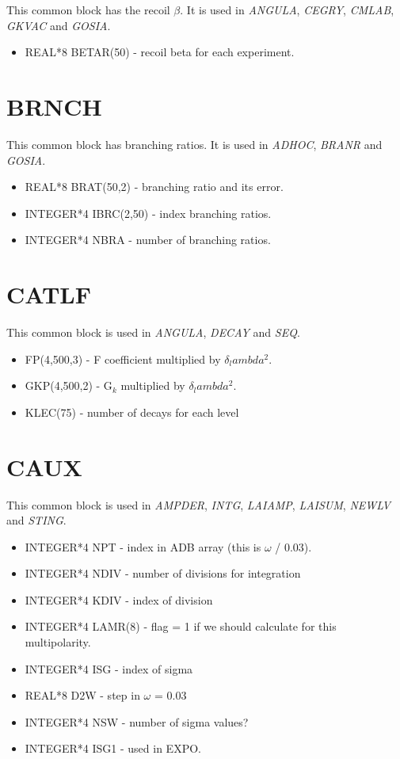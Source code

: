 This common block has the recoil $\beta$. It is used in {\em ANGULA}, {\em
CEGRY}, {\em CMLAB}, {\em GKVAC} and {\em GOSIA}.

\begin{itemize}
\item REAL*8 BETAR(50) - recoil beta for each experiment.
\end{itemize}

\section{BRNCH}

This common block has branching ratios. It is used in {\em ADHOC}, {\em
BRANR} and {\em GOSIA}.

\begin{itemize}
\item REAL*8 BRAT(50,2) - branching ratio and its error.
\item INTEGER*4 IBRC(2,50) - index branching ratios.
\item INTEGER*4 NBRA - number of branching ratios.
\end{itemize}

\section{CATLF}

This common block is used in {\em ANGULA}, {\em DECAY} and {\em SEQ}.

\begin{itemize}
\item FP(4,500,3) - F coefficient multiplied by $\delta_lambda^2$.
\item GKP(4,500,2) - G$_k$ multiplied by $\delta_lambda^2$.
\item KLEC(75) - number of decays for each level
\end{itemize}

\section{CAUX}

This common block is used in {\em AMPDER}, {\em INTG}, {\em LAIAMP}, {\em
LAISUM}, {\em NEWLV} and {\em STING}.

\begin{itemize}
\item INTEGER*4 NPT - index in ADB array (this is $\omega$ / 0.03).
\item INTEGER*4 NDIV - number of divisions for integration
\item INTEGER*4 KDIV - index of division
\item INTEGER*4 LAMR(8) - flag = 1 if we should calculate for this
multipolarity.
\item INTEGER*4 ISG - index of sigma
\item REAL*8 D2W - step in $\omega$ = 0.03
\item INTEGER*4 NSW - number of sigma values?
\item INTEGER*4 ISG1 - used in EXPO.
\end{itemize}

